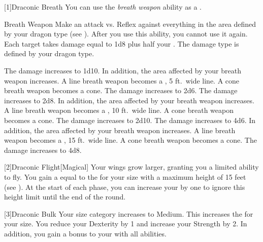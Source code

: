             [1]{Draconic Breath} You can use the \textit{breath weapon} ability as a .
            \begin{freeability}{Breath Weapon}
                Make an attack vs. Reflex against everything in the area defined by your dragon type (see ).
                After you use this ability, you  cannot use it again.
                \hit Each target takes damage equal to 1d8 plus half your .
                The damage type is defined by your dragon type.

                \rankline
                 The damage increases to 1d10.
                    In addition, the area affected by your breath weapon increases.
                    A line breath weapon becomes a \arealarge, 5 ft.\ wide line.
                    A cone breath weapon becomes a \areamed cone.
                 The damage increases to 2d6.
                 The damage increases to 2d8.
                    In addition, the area affected by your breath weapon increases.
                    A line breath weapon becomes a \areahuge, 10 ft.\ wide line.
                    A cone breath weapon becomes a \arealarge cone.
                 The damage increases to 2d10.
                 The damage increases to 4d6.
                    In addition, the area affected by your breath weapon increases.
                    A line breath weapon becomes a \areagarg, 15 ft.\ wide line.
                    A cone breath weapon becomes a \areahuge cone.
                 The damage increases to 4d8.
            \end{freeability}

            [2]{Draconic Flight}[Magical] Your wings grow larger, granting you a limited ability to fly.
            You gain a  equal to the  for your size with a maximum height of 15 feet (see ).
            At the start of each phase, you can increase your  by one to ignore this height limit until the end of the round.

            [3]{Draconic Bulk} Your size category increases to Medium.
            This increases the  for your size.
            You reduce your Dexterity by 1 and increase your Strength by 2.
            In addition, you gain a  bonus to your  with all abilities.

